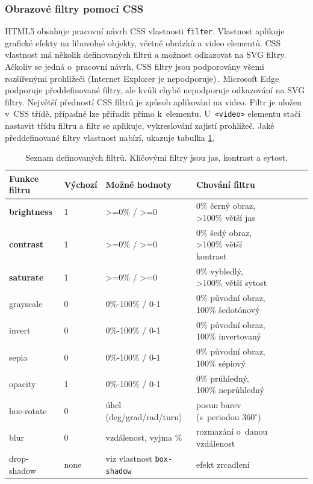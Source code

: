 \subsubsection{Obrazové filtry pomocí CSS}
HTML5 obsahuje pracovní návrh CSS vlastnosti \texttt{filter}. Vlastnost aplikuje grafické efekty na libovolné objekty, včetně obrázků a video elementů. CSS vlastnost má několik definovaných filtrů a možnost odkazovat na SVG filtry. Ačkoliv se jedná o~pracovní návrh, CSS filtry jsou podporovány všemi rozšířenými prohlížeči (Internet Explorer je nepodporuje)\,\cite{MDNfilter}. Microsoft Edge podporuje předdefinované filtry, ale kvůli chybě nepodporuje odkazování na SVG filtry. Největší předností CSS filtrů je způsob aplikování na video. Filtr je uložen v~CSS třídě, případně lze přiřadit přímo k~elementu. U~\texttt{<video>} elementu stačí nastavit třídu filtru a filtr se aplikuje, vykreslování zajistí prohlížeč. Jaké předdefinované filtry vlastnost  nabízí, ukazuje tabulka \ref{tab:filters}.
\begin{table}[h]
    \centering
    \begin{tabular}{|l|l|l|l|l|l|l|l|}
    \hline
    Funkce filtru   & Výchozí & Možné hodnoty & Chování filtru \\
    \hline
    \textbf{brightness}  & 1 & >=0\% / >=0 & 0\% černý obraz, >100\% větší jas \\
    \textbf{contrast}    & 1 & >=0\% / >=0 & 0\% šedý obraz, >100\% větší kontrast\\
    \textbf{saturate}    & 1 & >=0\% / >=0 & 0\% vybledlý, >100\% větší sytost\\
    grayscale   & 0 & 0\%-100\% / 0-1 & 0\% původní obraz, 100\% šedotónový\\
    invert      & 0 & 0\%-100\% / 0-1 & 0\% původní obraz, 100\% invertovaný\\
    sepia       & 0 & 0\%-100\% / 0-1 & 0\% původní obraz, 100\% sépiový\\
    opacity     & 1 & 0\%-100\% / 0-1 & 0\% průhledný, 100\% neprůhledný\\
    hue-rotate  & 0 & úhel (deg/grad/rad/turn) & posun barev (s~periodou 360$^{\circ}$)\\
    blur        & 0 & vzdálenost, vyjma \% & rozmazání o~danou vzdálenost \\
    drop-shadow & none & viz vlastnost \texttt{box-shadow} & efekt zrcadlení\\
    \hline
    \end{tabular}
    \caption{Seznam definovaných filtrů. Klíčovými filtry jsou jas, kontrast a sytost.}
    \label{tab:filters}
\end{table}\\

